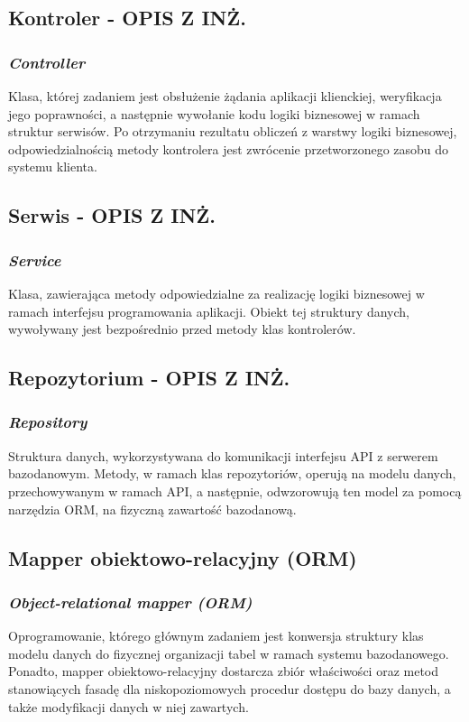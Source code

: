 \subsection*{Kontroler - OPIS Z INŻ.}
\subsubsection{\textit{Controller}}
Klasa, której zadaniem jest obsłużenie żądania aplikacji klienckiej, weryfikacja jego poprawności, a następnie wywołanie kodu logiki biznesowej w ramach struktur serwisów. Po otrzymaniu rezultatu obliczeń z warstwy logiki biznesowej, odpowiedzialnością metody kontrolera jest zwrócenie przetworzonego zasobu do systemu klienta.

\subsection*{Serwis - OPIS Z INŻ.}
\subsubsection{\textit{Service}}
Klasa, zawierająca metody odpowiedzialne za realizację logiki biznesowej w ramach interfejsu programowania aplikacji. Obiekt tej struktury danych, wywoływany jest bezpośrednio przed metody klas kontrolerów.  

\subsection*{Repozytorium - OPIS Z INŻ.}
\subsubsection{\textit{Repository}}
Struktura danych, wykorzystywana do komunikacji interfejsu API z serwerem bazodanowym. Metody, w ramach klas repozytoriów, operują na modelu danych, przechowywanym w ramach API, a następnie, odwzorowują ten model za pomocą narzędzia ORM, na fizyczną zawartość bazodanową.

\subsection*{Mapper obiektowo-relacyjny (ORM)}
\subsubsection{\textit{Object-relational mapper (ORM)}}
Oprogramowanie, którego głównym zadaniem jest konwersja struktury klas modelu danych do fizycznej organizacji tabel w ramach systemu bazodanowego. Ponadto, mapper obiektowo-relacyjny dostarcza zbiór właściwości oraz metod stanowiących fasadę dla niskopoziomowych procedur dostępu do bazy danych, a także modyfikacji danych w niej zawartych.


